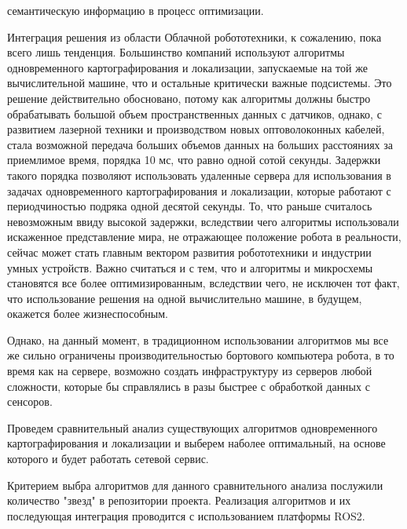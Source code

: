 \documentclass[a4paper, 14pt]{extreport}
\begin{document}
семантическую информацию в процесс оптимизации.
\par Интеграция решения из области Облачной робототехники, к сожалению, пока всего лишь тенденция. Большинство компаний используют
алгоритмы одновременного картографирования и локализации, запускаемые на той же вычислительной машине, что и остальные критически важные
подсистемы. Это решение действительно обосновано, потому как алгоритмы должны быстро обрабатывать большой объем пространственных данных
с датчиков, однако, с развитием лазерной техники и производством новых оптоволоконных кабелей, стала возможной передача больших объемов
данных на больших расстояниях за приемлимое время, порядка 10 мс, что равно одной сотой секунды. Задержки такого порядка позволяют
использовать удаленные сервера для использования в задачах одновременного картографирования и локализации, которые работают с
периодчиностью подряка одной десятой секунды. То, что раньше считалось невозможным ввиду высокой задержки, вследствии чего алгоритмы использовали искаженное 
представление мира, не отражающее положение робота в реальности, сейчас может стать главным вектором развития робототехники и индустрии
умных устройств. Важно считаться и с тем, что и алгоритмы и микросхемы становятся все более оптимизированным, вследствии чего, не исключен 
тот факт, что использование решения на одной вычислительно машине, в будущем, окажется более жизнеспособным. 
\par\noindent Однако, на данный момент, в традиционном использовании алгоритмов мы все же сильно ограничены производительностью бортового
 компьютера робота, в то время как на сервере, возможно создать инфраструктуру из серверов любой сложности, которые бы справлялись в разы
 быстрее с обработкой данных с сенсоров. 
\par\noindent Проведем сравнительный анализ существующих алгоритмов одновременного картографирования и локализации и выберем наболее 
 оптимальный, на основе которого и будет работать сетевой сервис.
\par\noindent Критерием выбра алгоритмов для данного сравнительного анализа послужили количество "звезд" в репозитории проекта. Реализация
алгоритмов и их последующая интеграция проводится с использованием платформы ROS2.
\end{document}
